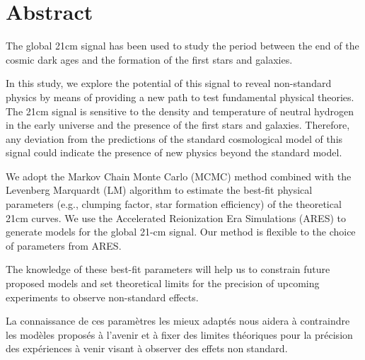\documentclass[12pt, TexShade, letterpaper]{report}
\begin{document}
\chapter*{Abstract}
	\label{chap:engAbstract}
The global 21cm signal has been used to study the period between the end of the cosmic dark ages and the formation of the first stars and galaxies. \par
In this study, we explore the potential of this signal to reveal non-standard physics by means of providing a new path to test fundamental physical theories. The 21cm signal is sensitive to the density and temperature of neutral hydrogen in the early universe and the presence of the first stars and galaxies. Therefore, any deviation from the predictions of the standard cosmological model of this signal could indicate the presence of new physics beyond the standard model.\par
We adopt the Markov Chain Monte Carlo (MCMC) method combined with the Levenberg Marquardt (LM) algorithm to estimate the best-fit physical parameters (e.g., clumping factor, star formation efficiency) of the theoretical 21cm curves. We use the Accelerated Reionization Era Simulations (ARES) to generate models for the global 21-cm signal. Our method is flexible to the choice of parameters from ARES.\par
The knowledge of these best-fit parameters will help us to constrain future proposed models and set theoretical limits for the precision of upcoming experiments to observe non-standard effects.\par
La connaissance de ces paramètres les mieux adaptés nous aidera à contraindre les modèles proposés à l'avenir et à fixer des limites théoriques pour la précision des expériences à venir visant à observer des effets non standard.\par
\end{document}
